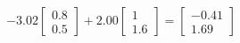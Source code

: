 \documentclass[preview]{standalone}
\begin{document}
\begin{align*}
-3.02 \begin{bmatrix} 0.8 \\ 0.5 \end{bmatrix} + 2.00 \begin{bmatrix} 1 \\ 1.6 \end{bmatrix} = \begin{bmatrix} -0.41 \\ 1.69 \end{bmatrix}
\end{align*}
\end{document}
